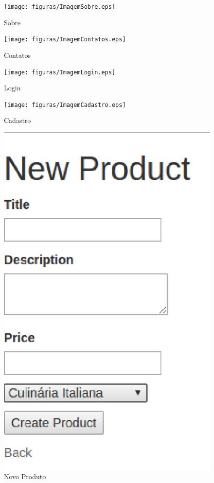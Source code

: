 \begin{apendicesenv}
\begin{figure}[h]
    \centering
    \label{fig01}
        \texttt{[image: figuras/ImagemSobre.eps]}
    \caption{Sobre}
\end{figure}

\begin{figure}[h]
    \centering
    \label{fig01}
        \texttt{[image: figuras/ImagemContatos.eps]}
    \caption{Contatos}
\end{figure}

\begin{figure}[h]
    \centering
    \label{fig01}
        \texttt{[image: figuras/ImagemLogin.eps]}
    \caption{Login}
\end{figure}

\begin{figure}[h]
    \centering
    \label{fig01}
        \texttt{[image: figuras/ImagemCadastro.eps]}
    \caption{Cadastro}
\end{figure}

\begin{figure}[h]
    \centering
    \label{fig01}
        \includegraphics[keepaspectratio=true,scale=0.8]{figuras/NovoProduto.eps}
    \caption{Novo Produto}
\end{figure}


\end{apendicesenv}
